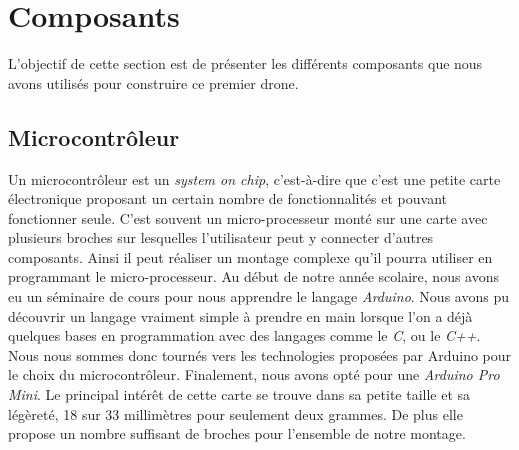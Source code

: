 \documentclass[a4paper,10pt]{report}
\begin{document}
    \section{Composants}
      L'objectif de cette section est de présenter les différents composants 
que nous avons utilisés pour construire ce premier drone.
      
      \subsection{Microcontrôleur}
	Un microcontrôleur est un \textit{system on chip}, c'est-à-dire que 
c'est une petite carte électronique proposant un certain nombre de 
fonctionnalités et pouvant fonctionner seule. C'est souvent un micro-processeur 
monté sur une carte avec plusieurs broches sur lesquelles l'utilisateur peut y 
connecter d'autres composants. Ainsi il peut réaliser un montage complexe qu'il 
pourra utiliser en programmant le micro-processeur.
	Au début de notre année scolaire, nous avons eu un séminaire de cours 
pour nous apprendre le langage \textit{Arduino}. Nous avons pu découvrir un 
langage vraiment simple à prendre en main lorsque l'on a déjà quelques bases en 
programmation avec des langages comme le \textit{C}, ou le \textit{C++}. Nous 
nous sommes donc tournés vers les technologies proposées par Arduino pour le 
choix du microcontrôleur. Finalement, nous avons opté pour une \textit{Arduino 
Pro Mini}. Le principal intérêt de cette carte se trouve dans sa petite taille 
et sa légèreté, 18 sur 33 millimètres pour seulement deux grammes. De plus elle 
propose un nombre suffisant de broches pour l'ensemble de notre montage.
	
\end{document}

